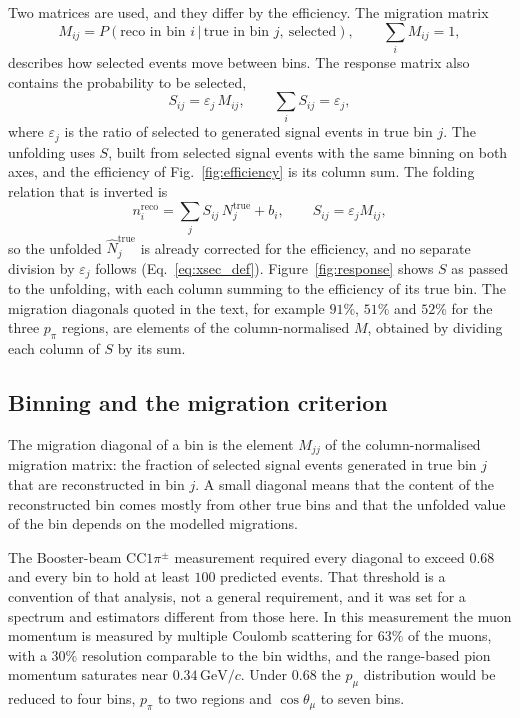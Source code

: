 \documentclass[11pt,a4paper]{article}
\newcommand{\GeVc}{\,\text{GeV}\!/c}
\begin{document}
Two matrices are used, and they differ by the efficiency. The migration matrix
\begin{equation}
  M_{ij} = P(\text{reco in bin } i \,|\, \text{true in bin } j,\ \text{selected}),
  \qquad \textstyle\sum_i M_{ij} = 1,
\end{equation}
describes how selected events move between bins. The response matrix also contains the
probability to be selected,
\begin{equation}
  S_{ij} = \varepsilon_j\, M_{ij},
  \qquad \textstyle\sum_i S_{ij} = \varepsilon_j,
  \label{eq:smearcept}
\end{equation}
where $\varepsilon_j$ is the ratio of selected to generated signal events in true bin $j$. The
unfolding uses $S$, built from selected signal events with the same binning on both axes, and the
efficiency of Fig.~\ref{fig:efficiency} is its column sum. The folding relation that is inverted is
\begin{equation}
  n_i^{\mathrm{reco}} = \sum_j S_{ij}\,N_j^{\mathrm{true}} + b_i,
  \qquad S_{ij}=\varepsilon_j M_{ij},
  \label{eq:folding}
\end{equation}
so the unfolded $\hat N_j^{\mathrm{true}}$ is already corrected for the efficiency, and no separate
division by $\varepsilon_j$ follows (Eq.~\eqref{eq:xsec_def}). Figure~\ref{fig:response} shows $S$
as passed to the unfolding, with each column summing to the efficiency of its true bin. The
migration diagonals quoted in the text, for example $91\%$, $51\%$ and $52\%$ for the three
$p_\pi$ regions, are elements of the column-normalised $M$, obtained by dividing each column of $S$ by its
sum.

\subsection{Binning and the migration criterion}
\label{sec:binning_rule}

The migration diagonal of a bin is the element $M_{jj}$ of the column-normalised migration matrix:
the fraction of selected signal events generated in true bin $j$ that are reconstructed in bin $j$.
A small diagonal means that the content of the reconstructed bin comes mostly from other true bins and
that the unfolded value of the bin depends on the modelled migrations.

The Booster-beam CC$1\pi^\pm$ measurement required every diagonal to exceed $0.68$ and every bin to
hold at least $100$ predicted events. That threshold is a convention of that analysis, not a general
requirement, and it was set for a spectrum and estimators different from those here. In this
measurement the muon momentum is measured by multiple Coulomb scattering for $63\%$ of the muons, with
a $30\%$ resolution comparable to the bin widths, and the range-based pion momentum saturates near
$0.34\GeVc$. Under $0.68$ the $p_\mu$ distribution would be reduced to four bins, $p_\pi$ to two
regions and $\cos\theta_\mu$ to seven bins.
\end{document}
